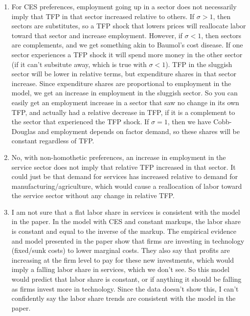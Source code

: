 \documentclass{article}
\begin{document}
\begin{enumerate}
    \item For CES preferences, employment going up in a sector does not necessarily imply that TFP in that sector increased relative to others. 
    If $\sigma > 1$, then sectors are substitutes, so a TFP shock that lowers prices will reallocate labor toward that sector and increase employment. 
    However, if $\sigma < 1$, then sectors are complements, and we get something akin to Baumol's cost disease. 
    If one sector experiences a TFP shock it will spend more money in the other sector (if it can't subsitute away, which is true with $\sigma < 1$). 
    TFP in the sluggish sector will be lower in relative terms, but expenditure shares in that sector increase. 
    Since expenditure shares are proportional to employment in the model, we get an increase in employment in the sluggish sector.
    So you can easily get an employment increase in a sector that saw no change in its own TFP, and actually had a relative decrease in TFP, if it is a complement to the sector that experienced the TFP shock.
    If $\sigma = 1$, then we have Cobb-Douglas and employment depends on factor demand, so these shares will be constant regardless of TFP.

    \item No, with non-homothetic preferences, an increase in employment in the service sector does not imply that relative TFP increased in that sector. 
    It could just be that demand for services has increased relative to demand for manufacturing/agriculture, which would cause a reallocation of labor toward the service sector without any change in relative TFP.

    \item I am not sure that a flat labor share in services is consistent with the model in the paper.
    In the model with CES and constant markups, the labor share is constant and equal to the inverse of the markup. 
    The empirical evidence and model presented in the paper show that firms are investing in technology (fixed/sunk costs) to lower marginal costs. 
    They also say that profits are increasing at the firm level to pay for these new investments, which would imply a falling labor share in services, which we don't see. 
    So this model would predict that labor share is constant, or if anything it should be falling as firms invest more in technology. 
    Since the data doesn't show this, I can't confidently say the labor share trends are consistent with the model in the paper.

\end{enumerate}


\clearpage
\end{document}
